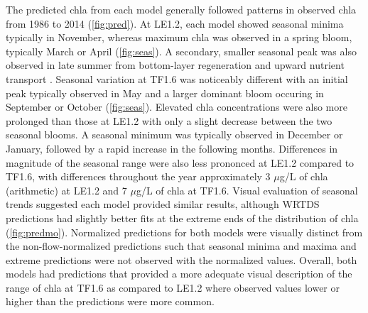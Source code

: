 \documentclass[letterpaper,12pt,oneside]{article}\usepackage[]{graphicx}\usepackage[]{color}
\newcommand{\mugl}{$\mu$g/L }
\begin{document}
The predicted \ac{chla} from each model generally followed patterns in observed \ac{chla} from 1986 to 2014 (\cref{fig:pred}).  At LE1.2, each model showed seasonal minima typically in November, whereas maximum \ac{chla} was observed in a spring bloom, typically March or April (\cref{fig:seas}).  A secondary, smaller seasonal peak was also observed in late summer from bottom-layer regeneration and upward nutrient transport \citep{Testa08a}.  Seasonal variation at TF1.6 was noticeably different with an initial peak typically observed in May and a larger dominant bloom occuring in September or October (\cref{fig:seas}).  Elevated \ac{chla}  concentrations were also more prolonged than those at LE1.2 with only a slight decrease between the two seasonal blooms.  A seasonal minimum was typically observed in December or January, followed by a rapid increase in the following months.  Differences in magnitude of the seasonal range were also less prononced at LE1.2 compared to TF1.6, with differences throughout the year approximately 3 \mugl of \ac{chla} (arithmetic) at LE1.2 and 7 \mugl of \ac{chla} at TF1.6. Visual evaluation of seasonal trends suggested each model provided similar results, although \ac{WRTDS} predictions had slightly better fits at the extreme ends of the distribution of \ac{chla} (\cref{fig:predmo}).  Normalized predictions for both models were visually distinct from the non-flow-normalized predictions such that seasonal minima and maxima and extreme predictions were not observed with the normalized values.  Overall, both models had predictions that provided a more adequate visual description of the range of \ac{chla} at TF1.6 as compared to LE1.2 where observed values lower or higher than the predictions were more common.  
\end{document}
